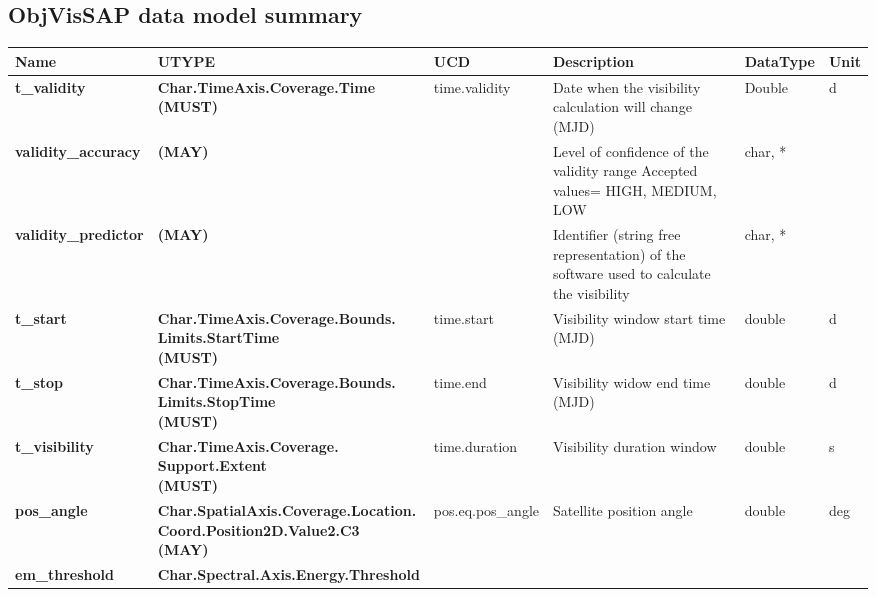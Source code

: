 \documentclass[11pt,a4paper]{ivoa}
\begin{document}
\begin{appendices}
\section{ObjVisSAP data model summary}
\FloatBarrier
\begin{table}[h]
\tiny
\centering
\begin{adjustbox}{angle=90}
\begin{tabular}{|p{25mm}|p{50mm}|p{20mm}|p{40mm}|p{15mm}|p{10mm}|}
\hline
Name & UTYPE & UCD & Description & DataType & Unit \\
\hline
\textbf{t\_validity} & \textbf{Char.TimeAxis.Coverage.Time  \newline
(MUST)} &
time.validity & Date when the \newline
visibility calculation will change (MJD) &
Double & d \\
\hline
\textbf{validity\_accuracy} & \textbf{(MAY)} & & Level of confidence
of the validity range \newline
Accepted values= HIGH, MEDIUM, LOW & char, * & \\
\hline
\textbf{validity\_predictor} & \textbf{(MAY)} & & Identifier (string
free representation) of the software used to calculate the visibility &
char, * & \\
\hline
\textbf{t\_start} & \textbf{
Char.TimeAxis.Coverage.Bounds. \newline
Limits.StartTime  \newline
(MUST)} & time.start &
Visibility window start time (MJD) & double & d \\
\hline
\textbf{t\_stop} & \textbf{
Char.TimeAxis.Coverage.Bounds. \newline
Limits.StopTime \newline
(MUST)} & time.end &
Visibility widow end time (MJD) & double & d \\
\hline
\textbf{t\_visibility} & \textbf{
Char.TimeAxis.Coverage. \newline
Support.Extent  \newline
(MUST)} & time.duration &
Visibility duration window & double & s \\
\hline
\textbf{pos\_angle} & \textbf{
Char.SpatialAxis.Coverage.Location. \newline
Coord.Position2D.Value2.C3  \newline
(MAY)} &
pos.eq.pos\_angle & Satellite position angle & double & deg \\
\hline
\textbf{em\_threshold} & \textbf{
Char.Spectral.Axis.Energy.Threshold \newline
}
\end{tabular}
\end{adjustbox}
\end{table}
\end{appendices}
\end{document}

